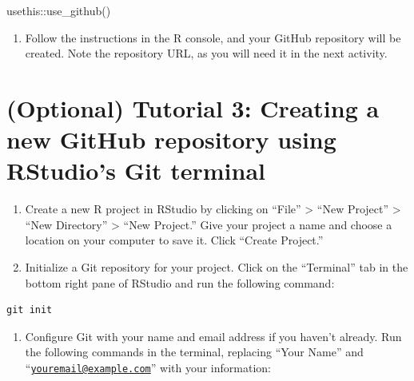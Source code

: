 \documentclass[
]{book}
\newenvironment{Shaded}{\begin{snugshade}}{\end{snugshade}}
\newcommand{\FunctionTok}[1]{\textcolor[rgb]{0.00,0.00,0.00}{#1}}
\newcommand{\NormalTok}[1]{#1}
\newcommand{\SpecialCharTok}[1]{\textcolor[rgb]{0.00,0.00,0.00}{#1}}
\providecommand{\tightlist}{%
  \setlength{\itemsep}{0pt}\setlength{\parskip}{0pt}}
\begin{document}
\begin{Shaded}
\begin{Highlighting}[]
\NormalTok{usethis}\SpecialCharTok{::}\FunctionTok{use\_github}\NormalTok{()}
\end{Highlighting}
\end{Shaded}

\begin{enumerate}
\def\labelenumi{\arabic{enumi}.}
\setcounter{enumi}{8}
\tightlist
\item
  Follow the instructions in the R console, and your GitHub repository will be created. Note the repository URL, as you will need it in the next activity.
\end{enumerate}

\hypertarget{optional-tutorial-3-creating-a-new-github-repository-using-rstudios-git-terminal}{%
\section{(Optional) Tutorial 3: Creating a new GitHub repository using RStudio's Git terminal}\label{optional-tutorial-3-creating-a-new-github-repository-using-rstudios-git-terminal}}

\begin{enumerate}
\def\labelenumi{\arabic{enumi}.}
\item
  Create a new R project in RStudio by clicking on ``File'' \textgreater{} ``New Project'' \textgreater{} ``New Directory'' \textgreater{} ``New Project.'' Give your project a name and choose a location on your computer to save it. Click ``Create Project.''
\item
  Initialize a Git repository for your project. Click on the ``Terminal'' tab in the bottom right pane of RStudio and run the following command:
\end{enumerate}

\begin{verbatim}
git init
\end{verbatim}

\begin{enumerate}
\def\labelenumi{\arabic{enumi}.}
\setcounter{enumi}{2}
\tightlist
\item
  Configure Git with your name and email address if you haven't already. Run the following commands in the terminal, replacing ``Your Name'' and ``\href{mailto:youremail@example.com}{\nolinkurl{youremail@example.com}}'' with your information:
\end{enumerate}
\end{document}
